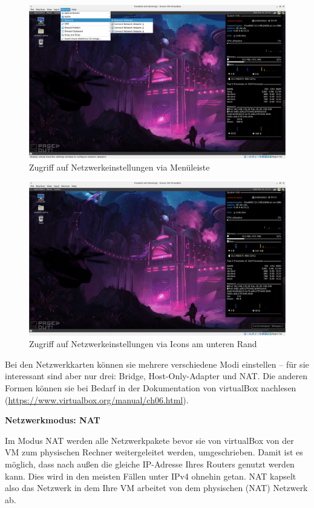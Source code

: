 \documentclass[paper=a4,fontsize=11pt]{scrartcl}%
\numberwithin{equation}{section}
\begin{document}
\begin{figure}[H]
\centering
\includegraphics[scale=0.2]{vbox11}
\caption{Zugriff auf Netzwerkeinstellungen via Menüleiste}
\label{vbox3}
\end{figure}
\begin{figure}[H]
\centering
\includegraphics[scale=0.2]{vbox12}
\caption{Zugriff auf Netzwerkeinstellungen via Icons am unteren Rand}
\label{vbox4}
\end{figure}
Bei den Netzwerkkarten können sie mehrere verschiedene Modi einstellen -- für sie interessant sind aber nur drei: Bridge, Host-Only-Adapter und NAT. Die anderen Formen können sie bei Bedarf in der Dokumentation von virtualBox nachlesen (\url{https://www.virtualbox.org/manual/ch06.html}).
\begin{center}
\Large{\textbf{Netzwerkmodus: NAT}}
\end{center}
Im Modus NAT werden alle Netzwerkpakete bevor sie von virtualBox von der VM zum physischen Rechner weitergeleitet werden, umgeschrieben. Damit ist es möglich, dass nach außen die gleiche IP-Adresse Ihres Routers genutzt werden kann. Dies wird in den meisten Fällen unter IPv4 ohnehin getan. NAT kapselt also das Netzwerk in dem Ihre VM arbeitet von dem physischen (NAT) Netzwerk ab.
\end{document}
